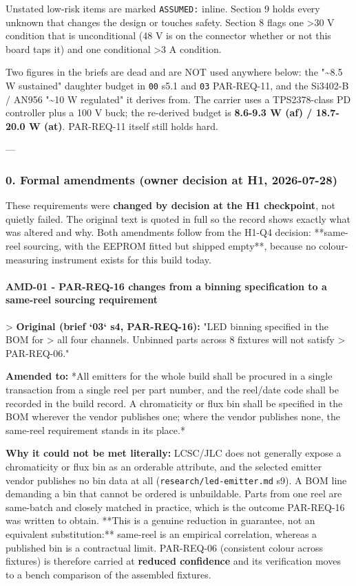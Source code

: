 \documentclass[11pt,a4paper]{article}
\begin{document}
Unstated low-risk items are marked \texttt{ASSUMED:} inline. Section 9 holds every unknown that changes the design or touches safety. Section 8 flags one \textgreater{}30 V condition that is unconditional (48 V is on the connector whether or not this board taps it) and one conditional \textgreater{}3 A condition.

Two figures in the briefs are dead and are NOT used anywhere below: the "\textasciitilde{}8.5 W sustained" daughter budget in \texttt{00} s5.1 and \texttt{03} PAR-REQ-11, and the Si3402-B / AN956 "\textasciitilde{}10 W regulated" it derives from. The carrier uses a TPS2378-class PD controller plus a 100 V buck; the re-derived budget is \textbf{8.6-9.3 W (af) / 18.7-20.0 W (at)}. PAR-REQ-11 itself still holds hard.

---

\subsubsection*{0. Formal amendments (owner decision at H1, 2026-07-28)}
These requirements were \textbf{changed by decision at the H1 checkpoint}, not quietly failed. The original text is quoted in full so the record shows exactly what was altered and why. Both amendments follow from the H1-Q4 decision: {*}{*}same-reel sourcing, with the EEPROM fitted but shipped empty{*}{*}, because no colour-measuring instrument exists for this build today.

\paragraph*{AMD-01 - PAR-REQ-16 changes from a binning specification to a same-reel sourcing requirement}
\textgreater{} \textbf{Original (brief `03` s4, PAR-REQ-16):} "LED binning specified in the BOM for \textgreater{} all four channels. Unbinned parts across 8 fixtures will not satisfy \textgreater{} PAR-REQ-06."

\textbf{Amended to:} {*}All emitters for the whole build shall be procured in a single transaction from a single reel per part number, and the reel/date code shall be recorded in the build record. A chromaticity or flux bin shall be specified in the BOM wherever the vendor publishes one; where the vendor publishes none, the same-reel requirement stands in its place.{*}

\textbf{Why it could not be met literally:} LCSC/JLC does not generally expose a chromaticity or flux bin as an orderable attribute, and the selected emitter vendor publishes no bin data at all (\texttt{research/led-emitter.md} s9). A BOM line demanding a bin that cannot be ordered is unbuildable. Parts from one reel are same-batch and closely matched in practice, which is the outcome PAR-REQ-16 was written to obtain. {*}{*}This is a genuine reduction in guarantee, not an equivalent substitution:{*}{*} same-reel is an empirical correlation, whereas a published bin is a contractual limit. PAR-REQ-06 (consistent colour across fixtures) is therefore carried at \textbf{reduced confidence} and its verification moves to a bench comparison of the assembled fixtures.
\end{document}
